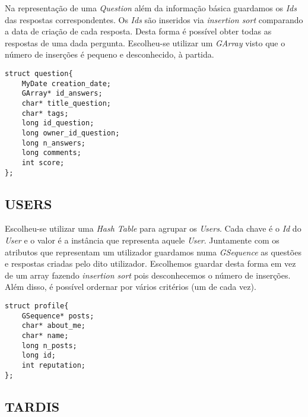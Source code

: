\documentclass[letterpaper, 10 pt, conference]{IEEEtran}  %
\begin{document}
Na representação de uma \textit{Question} além da informação básica guardamos os \textit{Ids} das respostas correspondentes. Os \textit{Ids} são inseridos via \textit{insertion sort} comparando a data de criação de cada resposta. Desta forma é possível obter todas as respostas de uma dada pergunta.
Escolheu-se utilizar um \textit{GArray} visto que o número de inserções é pequeno e desconhecido, à partida.

\begin{lstlisting}
struct question{
    MyDate creation_date;
    GArray* id_answers;
    char* title_question;
    char* tags;
    long id_question;
    long owner_id_question;
    long n_answers;
    long comments;
    int score;
};
\end{lstlisting}

\subsection{USERS}

Escolheu-se utilizar uma \textit{Hash Table} para agrupar os \textit{Users}. Cada chave é o \textit{Id} do \textit{User} e o valor é a instância que representa aquele \textit{User}.
Juntamente com os atributos que representam um utilizador guardamos numa \textit{GSequence} as questões e respostas criadas pelo dito utilizador. Escolhemos guardar desta forma em vez de um array fazendo \textit{insertion sort} pois desconhecemos o número de inserções. Além disso, é possível ordernar por vários critérios (um de cada vez).

\begin{lstlisting}
struct profile{
    GSequence* posts;
    char* about_me;
    char* name;
    long n_posts;
    long id;
    int reputation;
};
\end{lstlisting}


\subsection{TARDIS}
\end{document}
